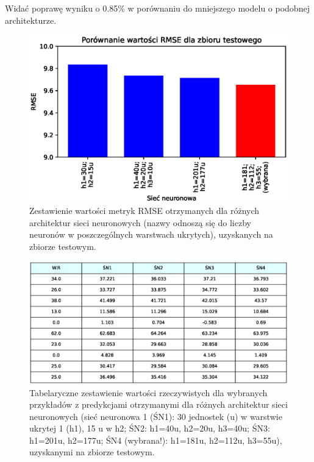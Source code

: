 \documentclass[a4paper,11pt]{article}
\begin{document}
    Widać poprawę wyniku o 0.85\% w porównaniu do mniejszego modelu o podobnej architekturze.

    \bigskip

    \begin{figure}[H]
        \label{fig:compr_rmse}
        \centering
        \includegraphics[width=\textwidth]{compr_rmse}
        \caption{Zestawienie wartości metryk RMSE otrzymanych dla różnych architektur sieci neuronowych (nazwy odnoszą się do liczby neuronów w poszczególnych warstwach ukrytych), uzyskanych na zbiorze testowym.}
    \end{figure}

    \bigskip

    \begin{figure}[H]
        \label{fig:table_real_predictions}
        \centering
        \includegraphics[width=\textwidth]{table_real_predictions}
        \caption{Tabelaryczne zestawienie wartości rzeczywistych dla wybranych przykładów z predykcjami otrzymanymi dla różnych architektur sieci neuronowych (sieć neuronowa 1 (ŚN1): 30 jednostek (u) w warstwie ukrytej 1 (h1), 15 u w h2; ŚN2: h1=40u, h2=20u, h3=40u; ŚN3: h1=201u, h2=177u; ŚN4 (wybrana!): h1=181u, h2=112u, h3=55u), uzyskanymi na zbiorze testowym.}
    \end{figure}
\end{document}
